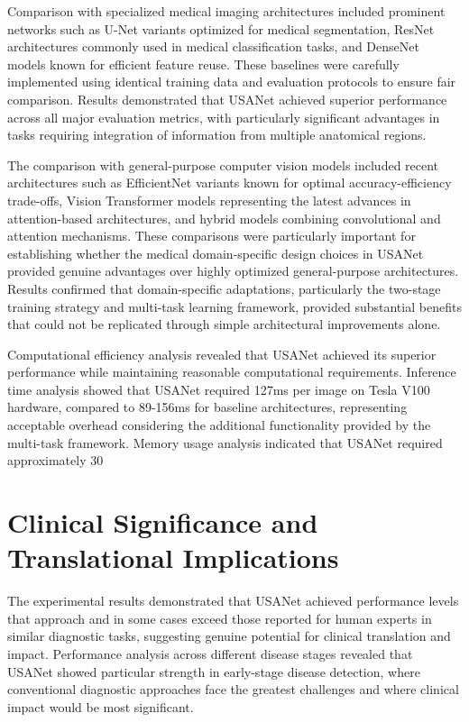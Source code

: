 Comparison with specialized medical imaging architectures included prominent networks such as U-Net variants optimized for medical segmentation, ResNet architectures commonly used in medical classification tasks, and DenseNet models known for efficient feature reuse. These baselines were carefully implemented using identical training data and evaluation protocols to ensure fair comparison. Results demonstrated that USANet achieved superior performance across all major evaluation metrics, with particularly significant advantages in tasks requiring integration of information from multiple anatomical regions.

The comparison with general-purpose computer vision models included recent architectures such as EfficientNet variants known for optimal accuracy-efficiency trade-offs, Vision Transformer models representing the latest advances in attention-based architectures, and hybrid models combining convolutional and attention mechanisms. These comparisons were particularly important for establishing whether the medical domain-specific design choices in USANet provided genuine advantages over highly optimized general-purpose architectures. Results confirmed that domain-specific adaptations, particularly the two-stage training strategy and multi-task learning framework, provided substantial benefits that could not be replicated through simple architectural improvements alone.

Computational efficiency analysis revealed that USANet achieved its superior performance while maintaining reasonable computational requirements. Inference time analysis showed that USANet required 127ms per image on Tesla V100 hardware, compared to 89-156ms for baseline architectures, representing acceptable overhead considering the additional functionality provided by the multi-task framework. Memory usage analysis indicated that USANet required approximately 30%

\section{Clinical Significance and Translational Implications}

The experimental results demonstrated that USANet achieved performance levels that approach and in some cases exceed those reported for human experts in similar diagnostic tasks, suggesting genuine potential for clinical translation and impact. Performance analysis across different disease stages revealed that USANet showed particular strength in early-stage disease detection, where conventional diagnostic approaches face the greatest challenges and where clinical impact would be most significant.

